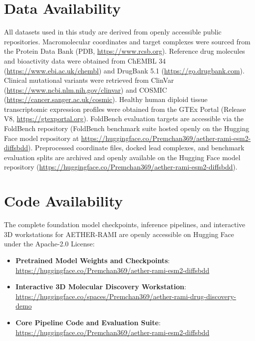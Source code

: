 \documentclass[11pt,a4paper]{article}
\begin{document}
\section*{Data Availability}
All datasets used in this study are derived from openly accessible public repositories. Macromolecular coordinates and target complexes were sourced from the Protein Data Bank (PDB, \url{https://www.rcsb.org}). Reference drug molecules and bioactivity data were obtained from ChEMBL 34 (\url{https://www.ebi.ac.uk/chembl}) and DrugBank 5.1 (\url{https://go.drugbank.com}). Clinical mutational variants were retrieved from ClinVar (\url{https://www.ncbi.nlm.nih.gov/clinvar}) and COSMIC (\url{https://cancer.sanger.ac.uk/cosmic}). Healthy human diploid tissue transcriptomic expression profiles were obtained from the GTEx Portal (Release V8, \url{https://gtexportal.org}). FoldBench evaluation targets are accessible via the FoldBench repository (FoldBench benchmark suite hosted openly on the Hugging Face model repository at \url{https://huggingface.co/Premchan369/aether-rami-esm2-diffsbdd}). Preprocessed coordinate files, docked lead complexes, and benchmark evaluation splits are archived and openly available on the Hugging Face model repository (\url{https://huggingface.co/Premchan369/aether-rami-esm2-diffsbdd}).

\section*{Code Availability}
The complete foundation model checkpoints, inference pipelines, and interactive 3D workstations for AETHER-RAMI are openly accessible on Hugging Face under the Apache-2.0 License:
\begin{itemize}\setlength{\itemsep}{0.5em}
    \item \textbf{Pretrained Model Weights and Checkpoints}:\\
    \url{https://huggingface.co/Premchan369/aether-rami-esm2-diffsbdd}
    \item \textbf{Interactive 3D Molecular Discovery Workstation}:\\
    \url{https://huggingface.co/spaces/Premchan369/aether-rami-drug-discovery-demo}
    \item \textbf{Core Pipeline Code and Evaluation Suite}:\\
    \url{https://huggingface.co/Premchan369/aether-rami-esm2-diffsbdd}
\end{itemize}

\newpage
\end{document}

